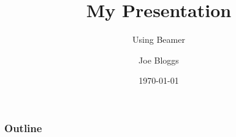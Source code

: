 \documentclass{beamer}
\title{My Presentation}
\subtitle{Using Beamer}
\author{Joe Bloggs}
\institute{University of ShareLaTeX}
\date{\today}
\begin{document}
\begin{frame}
\titlepage
\end{frame}

\begin{frame}
\frametitle{Outline}
\tableofcontents
\end{frame}



\end{document}
